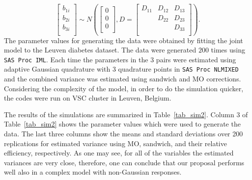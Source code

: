 \documentclass[11pt,a5paper,twoside]{book}
\begin{document}
{{\begin{equation}
\label{sim2_random_effect_dist}
\begin{bmatrix}
b_{1i} \\
b_{2i}\\
b_{3i}\\
\end{bmatrix} \sim N \left ( 
\begin{bmatrix}
0 \\
0\\
0\\
\end{bmatrix}, 
D=\begin{bmatrix}
D_{11} & D_{12} & D_{13}\\
 & D_{22} & D_{23}\\
&& D_{33}\\
\end{bmatrix}
\right).
\end{equation}
The parameter values for generating the data were obtained by fitting the joint model to the Leuven diabetes dataset. The data were generated $200$ times using {\tt{SAS Proc IML}}. Each time the parameters in the $3$ pairs were estimated using adaptive Gaussian quadrature \citep{pinheiro1995} with $3$ quadrature points in {\tt{SAS Proc NLMIXED}} and the combined variance was estimated using sandwich and MO corrections. Considering the complexity of the model, in order to do the simulation quicker, the codes were run on VSC cluster in Leuven, Belgium.

The results of the simulations are summarized in Table~\ref{tab_sim2}. Column 3 of Table~\ref{tab_sim2} shows the parameter values which were used to generate the data. The last three columns show the means and standard deviations over 200 replications for estimated variance using MO, sandwich, and their relative efficiency, respectively. As one may see, for all of the variables the estimated variances are very close, therefore, one can conclude that our proposal performs well also in a complex model with non-Gaussian responses.

}}
\end{document}
